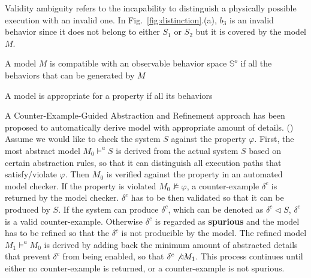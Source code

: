 \documentclass{llncs}
\newcommand{\figref}[1]{Fig.~\ref{fig:#1}}
\begin{document}
Validity ambiguity refers to the incapability to distinguish a physically possible execution with an invalid one. In \figref{distinction}.(a), $b_3$ is an invalid behavior since it does not belong to either $S_1$ or $S_2$ but it is covered by the model $M$. 

A model $M$ is compatible with an observable behavior space $\mathbb{S}^o$ if all the behaviors that can be generated by $M$ 

A model is appropriate for a property if all its behaviors  



A Counter-Example-Guided Abstraction and Refinement approach has been proposed to automatically derive model with appropriate amount of details. (\cite{CEGAR}) Assume we would like to check the system $S$ against the property $\varphi$. First, the most abstract model $M_0\models^a S$ is derived from the actual system $S$ based on certain abstraction rules, so that it can distinguish all execution paths that satisfy/violate $\varphi$. Then $M_0$ is verified against the property in an automated model checker. If the property is violated $M_0\not\models\varphi$, a counter-example $\delta^c$ is returned by the model checker. $\delta^c$ has to be then validated so that it can be produced by $S$. If the system can produce $\delta^c$, which can be denoted as $\delta^c\triangleleft S$, $\delta^c$ is a valid counter-example. Otherwise $\delta^c$ is regarded as \textbf{spurious} and the model has to be refined so that the $\delta^c$ is not producible by the model. The refined model $M_1\models^a M_0$ is derived by adding back the minimum amount of abstracted details that prevent $\delta^c$ from being enabled, so that $\delta^c\not\triangleleft M_1$. This process continues until either no counter-example is returned, or a counter-example is not spurious. 
\end{document}
